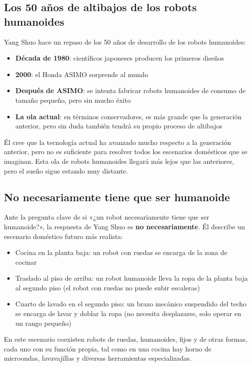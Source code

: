 \subsection{Los 50 años de altibajos de los robots humanoides}

Yang Shuo hace un repaso de los 50 años de desarrollo de los robots humanoides:
\begin{itemize}
    \item \textbf{Década de 1980}: científicos japoneses producen los primeros diseños
    \item \textbf{2000}: el Honda ASIMO sorprende al mundo
    \item \textbf{Después de ASIMO}: se intenta fabricar robots humanoides de consumo de tamaño pequeño, pero sin mucho éxito
    \item \textbf{La ola actual}: en términos conservadores, es más grande que la generación anterior, pero sin duda también tendrá su propio proceso de altibajos
\end{itemize}

Él cree que la tecnología actual ha avanzado mucho respecto a la generación anterior, pero no es suficiente para resolver todos los escenarios domésticos que se imaginan. Esta ola de robots humanoides llegará más lejos que las anteriores, pero el sueño sigue estando muy distante.

\subsection{No necesariamente tiene que ser humanoide}

Ante la pregunta clave de si «¿un robot necesariamente tiene que ser humanoide?», la respuesta de Yang Shuo es \textbf{no necesariamente}. Él describe un escenario doméstico futuro más realista:

\begin{itemize}
    \item Cocina en la planta baja: un robot con ruedas se encarga de la zona de cocinar
    \item Traslado al piso de arriba: un robot humanoide lleva la ropa de la planta baja al segundo piso (el robot con ruedas no puede subir escaleras)
    \item Cuarto de lavado en el segundo piso: un brazo mecánico suspendido del techo se encarga de lavar y doblar la ropa (no necesita desplazarse, solo operar en un rango pequeño)
\end{itemize}

En este escenario coexisten robots de ruedas, humanoides, fijos y de otras formas, cada uno con su función propia, tal como en una cocina hay horno de microondas, lavavajillas y diversas herramientas especializadas.

